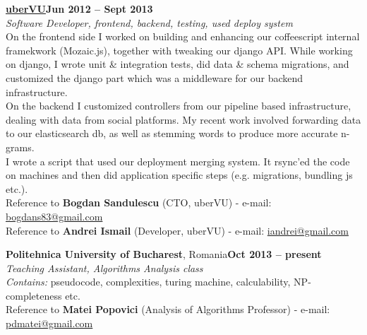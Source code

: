 \documentclass[margin,line]{resume}
\begin{document}
\begin{resume}
	\vspace{1.2mm}\href{http://www.ubervu.com}{\textbf{uberVU}}\hfill \textbf{Jun 2012 -- Sept 2013}\vspace{1.2mm}\\
	\vspace{1mm} \textsl{Software Developer, frontend, backend, testing, used deploy system}\vspace{1.5mm}\\
	On the frontend side I worked on building and enhancing our coffeescript internal framekwork (Mozaic.js), together with tweaking our django API. While working on django, I wrote unit \& integration tests, did data \& schema migrations, and customized the django part which was a middleware for our backend infrastructure.\\
	On the backend I customized controllers from our pipeline based infrastructure, dealing with data from social platforms. My recent work involved forwarding data to our elasticsearch db, as well as stemming words to produce more accurate n-grams.\\
	I wrote a script that used our deployment merging system. It rsync'ed the code on machines and then did application specific steps (e.g. migrations, bundling js etc.).\vspace{1.5mm}\\
	\small{Reference to \textbf{Bogdan Sandulescu} (CTO, uberVU) - e-mail: \href{mailto:bogdans83@gmail.com}{bogdans83@gmail.com}}\\
	\small{Reference to \textbf{Andrei Ismail} (Developer, uberVU) - e-mail: \href{mailto:iandrei@gmail.com}{iandrei@gmail.com}}

	\vspace{1.2mm}\textbf{Politehnica University of Bucharest}, Romania\hfill \textbf{Oct 2013 -- present}\vspace{1.2mm}\\
	\vspace{1mm} \textsl{Teaching Assistant, Algorithms Analysis class}\vspace{1.5mm}\\
	\textit{Contains:} pseudocode, complexities, turing machine, calculability, NP-completeness etc.\vspace{1.5mm}\\
	\small{Reference to \textbf{Matei Popovici} (Analysis of Algorithms Professor) - e-mail: \href{mailto:pdmatei@gmail.com}{pdmatei@gmail.com}}


\end{resume}
\end{document}
